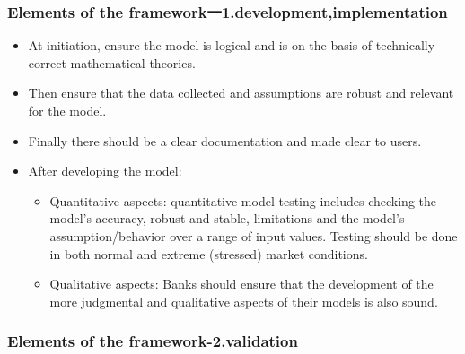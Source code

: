 \subsubsection{Elements of the framework一1.development,implementation}
\begin{itemize}
\item At initiation, ensure the model is logical and is on the basis of technically-correct mathematical theories.
\item Then ensure that the data collected and assumptions are robust and relevant for the model.
\item Finally there should be a clear documentation and made clear to users.
\item After developing the model:
    \begin{itemize}
    \item Quantitative aspects: quantitative model testing includes checking the model's accuracy, robust and stable, limitations and the model's assumption/behavior over a range of input values. Testing should be done in both normal and extreme (stressed) market conditions.
    \item Qualitative aspects: Banks should ensure that the development of the more judgmental and qualitative aspects of their models is also sound. 
    \end{itemize}
\end{itemize}




\subsubsection{Elements of the framework-2.validation}

